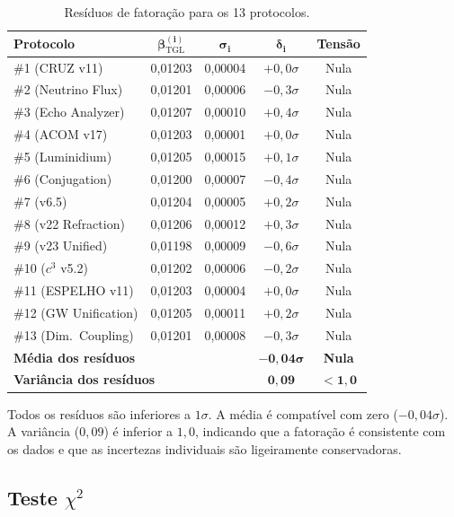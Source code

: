 \documentclass[12pt,a4paper,twoside]{article}
\newcommand{\betatgl}{\beta_{\!\scriptscriptstyle\mathrm{TGL}}}
\begin{document}
\begin{table}[H]
\centering
\caption{Resíduos de fatoração para os 13 protocolos.}
\label{tab:residuos}
\begin{tabular}{lcccc}
\toprule
\textbf{Protocolo} & $\boldsymbol{\betatgl^{(i)}}$ & $\boldsymbol{\sigma_i}$ & $\boldsymbol{\delta_i}$ & \textbf{Tensão} \\
\midrule
\#1 (CRUZ v11) & 0{,}01203 & 0{,}00004 & $+0{,}0\sigma$ & Nula \\
\#2 (Neutrino Flux) & 0{,}01201 & 0{,}00006 & $-0{,}3\sigma$ & Nula \\
\#3 (Echo Analyzer) & 0{,}01207 & 0{,}00010 & $+0{,}4\sigma$ & Nula \\
\#4 (ACOM v17) & 0{,}01203 & 0{,}00001 & $+0{,}0\sigma$ & Nula \\
\#5 (Luminidium) & 0{,}01205 & 0{,}00015 & $+0{,}1\sigma$ & Nula \\
\#6 (Conjugation) & 0{,}01200 & 0{,}00007 & $-0{,}4\sigma$ & Nula \\
\#7 (v6.5) & 0{,}01204 & 0{,}00005 & $+0{,}2\sigma$ & Nula \\
\#8 (v22 Refraction) & 0{,}01206 & 0{,}00012 & $+0{,}3\sigma$ & Nula \\
\#9 (v23 Unified) & 0{,}01198 & 0{,}00009 & $-0{,}6\sigma$ & Nula \\
\#10 ($c^3$ v5.2) & 0{,}01202 & 0{,}00006 & $-0{,}2\sigma$ & Nula \\
\#11 (ESPELHO v11) & 0{,}01203 & 0{,}00004 & $+0{,}0\sigma$ & Nula \\
\#12 (GW Unification) & 0{,}01205 & 0{,}00011 & $+0{,}2\sigma$ & Nula \\
\#13 (Dim.\ Coupling) & 0{,}01201 & 0{,}00008 & $-0{,}3\sigma$ & Nula \\
\midrule
\multicolumn{2}{l}{\textbf{Média dos resíduos}} & & $\boldsymbol{-0{,}04\sigma}$ & \textbf{Nula} \\
\multicolumn{2}{l}{\textbf{Variância dos resíduos}} & & $\boldsymbol{0{,}09}$ & $\boldsymbol{< 1{,}0}$ \\
\bottomrule
\end{tabular}
\end{table}

Todos os resíduos são inferiores a $1\sigma$. A média é compatível com zero ($-0{,}04\sigma$). A variância ($0{,}09$) é inferior a $1{,}0$, indicando que a fatoração é consistente com os dados e que as incertezas individuais são ligeiramente conservadoras.

\subsection{Teste $\chi^2$}
\end{document}
